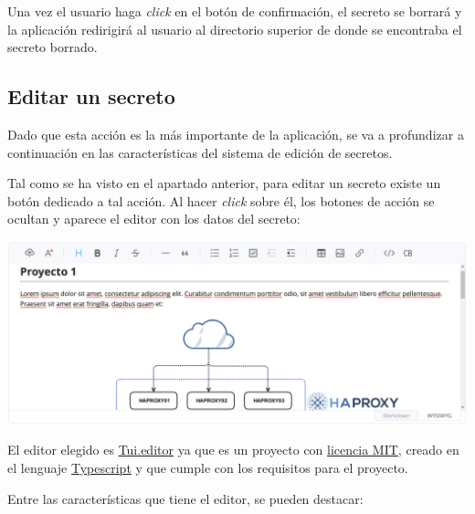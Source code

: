 \documentclass{\ClassPath/viu-tfm-template}
\begin{document}
Una vez el usuario haga \textit{click} en el botón de confirmación, el secreto se borrará y la aplicación redirigirá al usuario al directorio superior de donde se encontraba el secreto borrado.

\subsection{Editar un secreto}

Dado que esta acción es la más importante de la aplicación, se va a profundizar a continuación en las características del sistema de edición de secretos.

Tal como se ha visto en el apartado anterior, para editar un secreto existe un botón dedicado a tal acción. Al hacer \textit{click} sobre él, los botones de acción se ocultan y aparece el editor con los datos del secreto:

\begin{center}
    \includegraphics[width=\linewidth]{img/editor.png}
\end{center}

El editor elegido es \href{https://github.com/nhn/tui.editor}{Tui.editor} ya que es un proyecto con \href{https://es.wikipedia.org/wiki/Licencia_MIT}{licencia MIT}, creado en el lenguaje \href{https://es.wikipedia.org/wiki/TypeScript}{Typescript} y que cumple con los requisitos para el proyecto.

Entre las características que tiene el editor, se pueden destacar:
\end{document}

